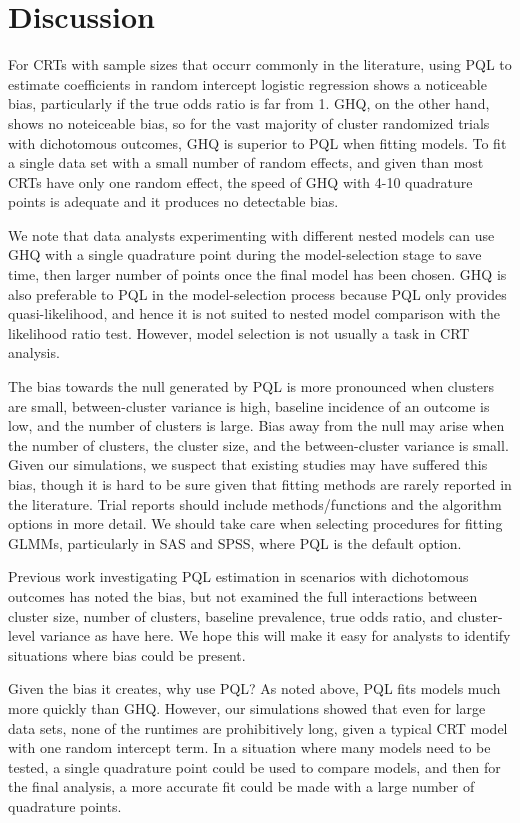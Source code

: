 \documentclass[Afour,times,sagev,doublespace]{sagej}
\begin{document}
\section{Discussion}

For CRTs with sample sizes that occurr commonly in the literature, using PQL to estimate coefficients in random intercept logistic regression shows a noticeable bias, particularly if the true odds ratio is far from 1. GHQ, on the other hand, shows no noteiceable bias, so for the vast majority of cluster randomized trials with dichotomous outcomes, GHQ is superior to PQL when fitting models. To fit a single data set with a small number of random effects, and given than most CRTs have only one random effect, the speed of GHQ with 4-10 quadrature points is adequate and it produces no detectable bias.

We note that data analysts experimenting with different nested models can use GHQ with a single quadrature point during the model-selection stage to save time, then larger number of points once the final model has been chosen. GHQ is also preferable to PQL in the model-selection process because PQL only provides quasi-likelihood, and hence it is not suited to nested model comparison with the likelihood ratio test. However, model selection is not usually a task in CRT analysis.

The bias towards the null generated by PQL is more pronounced when clusters are small, between-cluster variance is high, baseline incidence of an outcome is low, and the number of clusters is large. Bias away from the null may arise when the number of clusters, the cluster size, and the between-cluster variance is small. Given our simulations, we suspect that existing studies may have suffered this bias, though it is hard to be sure given that fitting methods are rarely reported in the literature. Trial reports should include methods/functions and the algorithm options in more detail.  We should take care when selecting procedures for fitting GLMMs, particularly in SAS and SPSS, where PQL is the default option.

Previous work investigating PQL estimation in scenarios with dichotomous outcomes has noted the bias\cite{jang_numerical_2009,zhang_fitting_2011}, but not examined the full interactions between cluster size, number of clusters, baseline prevalence, true odds ratio, and cluster-level variance as have here. We hope this will make it easy for analysts to identify situations where bias could be present.

Given the bias it creates, why use PQL? As noted above, PQL fits models much more quickly than GHQ. However, our simulations showed that even for large data sets, none of the runtimes are prohibitively long, given a typical CRT model with one random intercept term. In a situation where many models need to be tested, a single quadrature point could be used to compare models, and then for the final analysis, a more accurate fit could be made with a large number of quadrature points.
\end{document}
